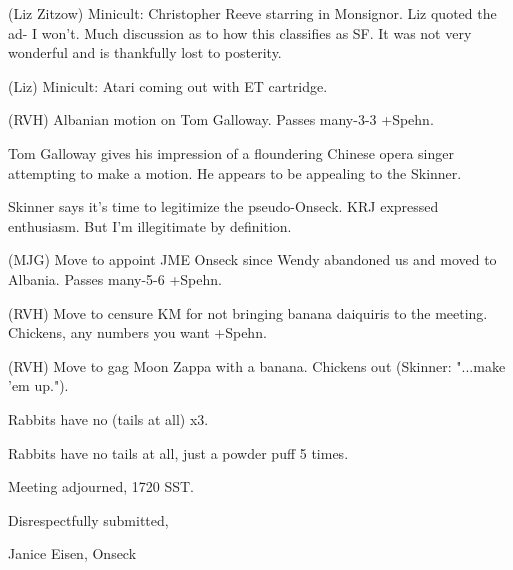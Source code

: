 \documentclass[12pt]{article}
\begin{document}
(Liz Zitzow) Minicult: Christopher Reeve starring in Monsignor. Liz quoted the ad- I won't. Much discussion as to how this classifies as SF. It was not very wonderful and is thankfully lost to posterity.

(Liz) Minicult: Atari coming out with ET cartridge.

(RVH) Albanian motion on Tom Galloway. Passes many-3-3 +Spehn.

Tom Galloway gives his impression of a floundering Chinese opera singer attempting to make a motion. He appears to be appealing to the Skinner.

Skinner says it's time to legitimize the pseudo-Onseck. KRJ expressed enthusiasm. But I'm illegitimate by definition.

(MJG) Move to appoint JME Onseck since Wendy abandoned us and moved to Albania. Passes many-5-6 +Spehn.

(RVH) Move to censure KM for not bringing banana daiquiris to the meeting. Chickens, any numbers you want +Spehn.

(RVH) Move to gag Moon Zappa with a banana. Chickens out (Skinner: "...make 'em up.").

Rabbits have no (tails at all) x3.

Rabbits have no tails at all, just a powder puff 5 times.

\vspace{12pt}

\noindent
Meeting adjourned, 1720 SST.

\vspace{18pt}

\centerline{Disrespectfully submitted,}
\centerline{Janice Eisen, Onseck}
\end{document}
